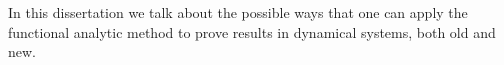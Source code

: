 
In this dissertation we talk about the possible ways that one can apply the functional analytic method to prove results in dynamical systems, both old and new.